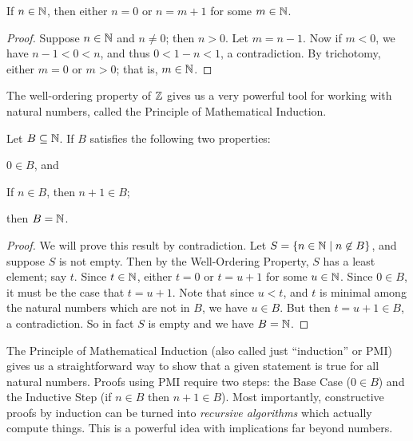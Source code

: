 \begin{prop}
If \(n \in \mathbb{N}\), then either \(n = 0\) or \(n = m+1\) for some \(m \in \mathbb{N}\).
\end{prop}

\begin{proof}
Suppose \(n \in \mathbb{N}\) and \(n \neq 0\); then \(n > 0\).
Let \(m = n-1\).
Now if \(m < 0\), we have \(n-1 < 0 < n\), and thus \(0 < 1-n < 1\), a contradiction.
By trichotomy, either \(m = 0\) or \(m > 0\); that is, \(m \in \mathbb{N}\).
\end{proof}

The well-ordering property of \(\mathbb{Z}\) gives us a very powerful tool for working with natural numbers, called the Principle of Mathematical Induction.

\begin{prop}
Let \(B \subseteq \mathbb{N}\).
If \(B\) satisfies the following two properties:
\begin{proplist}
\item \(0 \in B\), and
\item If \(n \in B\), then \(n+1 \in B\);
\end{proplist}
then \(B = \mathbb{N}\).
\end{prop}

\begin{proof}
We will prove this result by contradiction.
Let \(S = \{ n \in \mathbb{N} \mid n \not\in B \}\), and suppose \(S\) is not empty.
Then by the Well-Ordering Property, \(S\) has a least element; say \(t\).
Since \(t \in \mathbb{N}\), either \(t = 0\) or \(t = u+1\) for some \(u \in \mathbb{N}\).
Since \(0 \in B\), it must be the case that \(t = u+1\).
Note that since \(u < t\), and \(t\) is minimal among the natural numbers which are not in \(B\), we have \(u \in B\).
But then \(t = u+1 \in B\), a contradiction.
So in fact \(S\) is empty and we have \(B = \mathbb{N}\).
\end{proof}

The Principle of Mathematical Induction (also called just ``induction'' or PMI) gives us a straightforward way to show that a given statement is true for all natural numbers.
Proofs using PMI require two steps: the Base Case (\(0 \in B\)) and the Inductive Step (if \(n \in B\) then \(n+1 \in B\)).
Most importantly, constructive proofs by induction can be turned into \emph{recursive algorithms} which actually compute things.
This is a powerful idea with implications far beyond numbers.



\Exercises%

